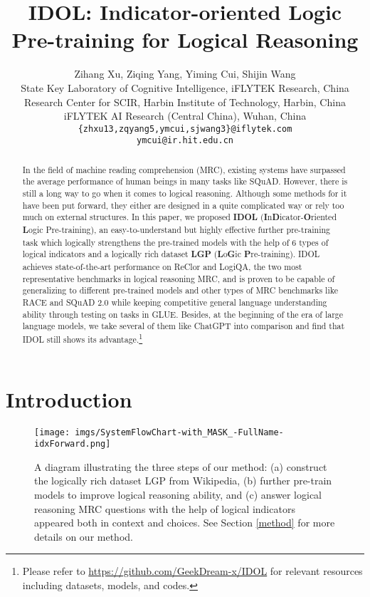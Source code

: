 \documentclass[11pt]{article}
\title{IDOL: Indicator-oriented Logic Pre-training for Logical Reasoning}
\author{
Zihang Xu,
Ziqing Yang,
Yiming Cui,
Shijin Wang \\
{State Key Laboratory of Cognitive Intelligence, iFLYTEK Research, China} \\
{Research Center for SCIR, Harbin Institute of Technology, Harbin, China 
} \\
{iFLYTEK AI Research (Central China), Wuhan, China
} \\
\tt\{zhxu13,zqyang5,ymcui,sjwang3\}@iflytek.com \\
\tt ymcui@ir.hit.edu.cn}
\begin{document}
\maketitle

\begin{abstract}



In the field of machine reading comprehension (MRC), existing systems have surpassed the average performance of human beings in many tasks like SQuAD. However, there is still a long way to go when it comes to logical reasoning. Although some methods for it have been put forward, they either are designed in a quite complicated way or rely too much on external structures. In this paper, we proposed \textbf{IDOL} (\textbf{I}n\textbf{D}icator-\textbf{O}riented \textbf{L}ogic Pre-training), an easy-to-understand but highly effective further pre-training task which logically strengthens the pre-trained models with the help of 6 types of logical indicators and a logically rich dataset \textbf{LGP} (\textbf{L}o\textbf{G}ic \textbf{P}re-training). IDOL achieves state-of-the-art performance on ReClor and LogiQA, the two most representative benchmarks in logical reasoning MRC, and is proven to be capable of generalizing to different pre-trained models and other types of MRC benchmarks like RACE and SQuAD 2.0 while keeping competitive general language understanding ability through testing on tasks in GLUE. Besides, at the beginning of the era of large language models, we take several of them like ChatGPT into comparison and find that IDOL still shows its advantage.\footnote{Please refer to \url{https://github.com/GeekDream-x/IDOL}  for relevant resources including datasets, models, and codes.}


\end{abstract}

\section{Introduction}

\begin{figure*}
\centering
\texttt{[image: imgs/SystemFlowChart-with\_MASK\_-FullName-idxForward.png]}
\caption{A diagram illustrating the three steps of our method: (a) construct the logically rich dataset LGP from Wikipedia, (b) further pre-train models to improve logical reasoning ability, and (c) answer logical reasoning MRC questions with the help of logical indicators appeared both in context and choices. See Section \ref{method} for more details on our method.}
\label{fig:systemflowchart}
\end{figure*}
\end{document}

